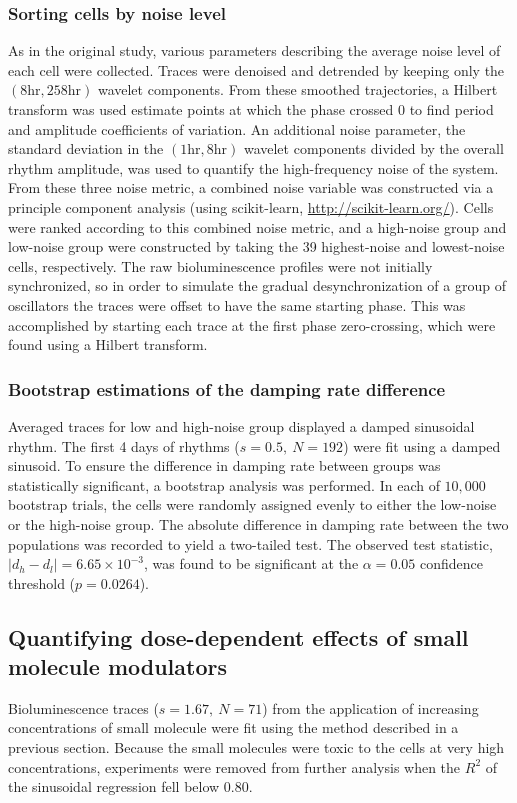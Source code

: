 \documentclass[11pt, letterpaper]{article}
\begin{document}
\subsubsection*{Sorting cells by noise level}
As in the original study, various parameters describing the average noise level of each cell were collected.
Traces were denoised and detrended by keeping only the $(8 \text{hr}, 258 \text{hr})$ wavelet components.
From these smoothed trajectories, a Hilbert transform was used estimate points at which the phase crossed $0$ to find period and amplitude coefficients of variation.
An additional noise parameter, the standard deviation in the $(1 \text{hr}, 8 \text{hr})$ wavelet components divided by the overall rhythm amplitude, was used to quantify the high-frequency noise of the system.
From these three noise metric, a combined noise variable was constructed via a principle component analysis (using scikit-learn, \url{http://scikit-learn.org/}).
Cells were ranked according to this combined noise metric, and a high-noise group and low-noise group were constructed by taking the 39 highest-noise and lowest-noise cells, respectively.
The raw bioluminescence profiles were not initially synchronized, so in order to simulate the gradual desynchronization of a group of oscillators the traces were offset to have the same starting phase. 
This was accomplished by starting each trace at the first phase zero-crossing, which were found using a Hilbert transform.

\subsubsection*{Bootstrap estimations of the damping rate difference}
Averaged traces for low and high-noise group displayed a damped sinusoidal rhythm.
The first 4 days of rhythms ($s = 0.5,\ N = 192$) were fit using a damped sinusoid.
To ensure the difference in damping rate between groups was statistically significant, a bootstrap analysis was performed.
In each of $10,000$ bootstrap trials, the cells were randomly assigned evenly to either the low-noise or the high-noise group.
The absolute difference in damping rate between the two populations was recorded to yield a two-tailed test.
The observed test statistic, $|d_h - d_l| = 6.65\times10^{-3}$, was found to be significant at the $\alpha = 0.05$ confidence threshold ($p = 0.0264$).

\subsection*{Quantifying dose-dependent effects of small molecule modulators}
Bioluminescence traces ($s = 1.67,\ N=71$) from the application of increasing concentrations of small molecule were fit using the method described in a previous section.
Because the small molecules were toxic to the cells at very high concentrations, experiments were removed from further analysis when the $R^2$ of the sinusoidal regression fell below $0.80$.
\end{document}
